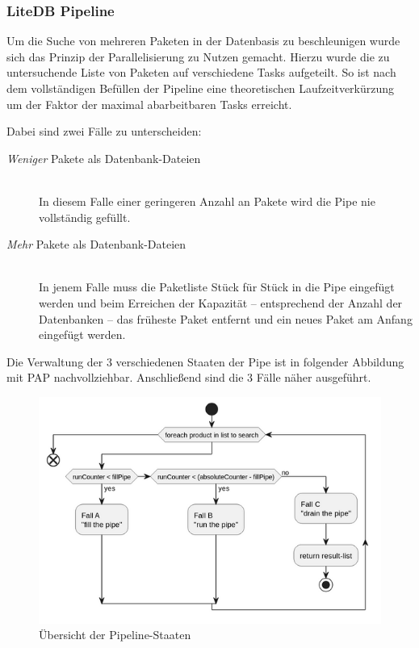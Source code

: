 \subsubsection{LiteDB Pipeline} \label{sec:ExperimentePIPE}
    Um die Suche von mehreren Paketen in der Datenbasis zu beschleunigen wurde sich das Prinzip der Parallelisierung zu Nutzen gemacht.
    Hierzu wurde die zu untersuchende Liste von Paketen auf verschiedene Tasks aufgeteilt.
    So ist nach dem vollständigen Befüllen der Pipeline eine theoretischen Laufzeitverkürzung um der Faktor der maximal abarbeitbaren Tasks erreicht.  
    
    Dabei sind zwei Fälle zu unterscheiden:
    \begin{description}
        \item[\textit{Weniger} Pakete als Datenbank-Dateien]\hfill \\
            In diesem Falle einer geringeren Anzahl an Pakete wird die Pipe nie vollständig gefüllt.
        \item[\textit{Mehr} Pakete als Datenbank-Dateien]\hfill \\
            In jenem Falle muss die Paketliste Stück für Stück in die Pipe eingefügt werden und beim Erreichen der Kapazität -- entsprechend der Anzahl der Datenbanken -- das früheste Paket entfernt und ein neues Paket am Anfang eingefügt werden.
    \end{description}
    
    Die Verwaltung der 3 verschiedenen Staaten der Pipe ist in folgender Abbildung mit \ac{PAP} nachvollziehbar.
    Anschließend sind die 3 Fälle näher ausgeführt.
    \begin{figure}[H]
        \centering
        \includegraphics[width=\textwidth]{../pap/Simultanius search on LiteDb-Files_k.png}
        \caption{Übersicht der Pipeline-Staaten}
        \label{png:OverviewPipelineStatus}
    \end{figure}

